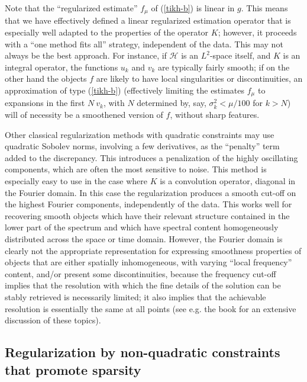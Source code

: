 \documentclass[10pt]{article}
\def\cH{\mathcal{H}}
\newcommand\eref[1]{(\ref{#1})}
\begin{document}
Note that the ``regularized estimate'' $f_\mu$ of \eref{tikh-b} is
linear
in $g$. This means that we have effectively defined a linear regularized
estimation operator that
is especially well adapted to the properties of the operator $K$; however,
it proceeds with a ``one method fits all'' strategy, independent of the data.
This may not
always be the best approach. For instance, if $\cH$ is an $L^2$-space
itself, and $K$
is an integral operator, the functions $u_k$ and $v_k$ are typically fairly
smooth;
if on the other hand the objects $f$ are
likely to have local singularities or discontinuities,
an approximation of type \eref{tikh-b}
(effectively limiting the estimates $f_\mu$
to expansions in the first $N ~v_k$, with $N$ determined by, say, $\sigma_k^2<
\mu/100$ for $k>N$) will of necessity be a smoothened version of $f$, without
sharp features.

Other classical regularization methods with
quadratic constraints may use quadratic Sobolev
norms, involving a few derivatives, as the ``penalty'' term added to the
discrepancy. This introduces a penalization of the
highly oscillating components, which are often the
most sensitive to noise. This method is especially
easy to use in the case where $K$ is a
convolution operator, diagonal in the Fourier domain.
In this case the regularization
produces a smooth cut-off on the highest Fourier components,
independently of the data.
 This works well
for recovering smooth objects which have their relevant structure contained in
the lower part of the spectrum and which have spectral content homogeneously
distributed across the space or time domain.
However, the Fourier domain is clearly not the appropriate representation
for expressing smoothness properties
of objects that are either spatially inhomogeneous, with
varying ``local frequency'' content, and/or present some
discontinuities, because
the frequency
cut-off implies that the resolution with which the fine details of the
solution can be stably retrieved is necessarily limited; it also
implies that the achievable
resolution is essentially the same at all points (see e.g. the book
\cite{Ber98}
for an extensive discussion of these topics).

\subsection{Regularization by non-quadratic constraints that promote sparsity}
\end{document}
